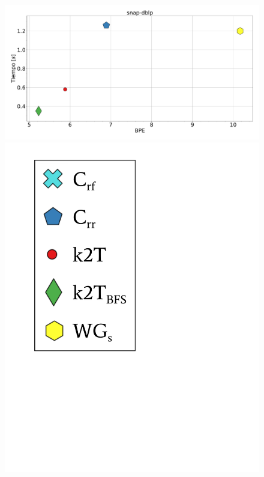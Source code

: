 \begin{figure}
    	\centering
    	\begin{minipage}{1\textwidth}
    			\centering
    			\begin{minipage}{0.8\textwidth}
    				\centering
    				\includegraphics[width=1\linewidth]{img/bpeTimes/secuencial/snap-dblp.pdf}
    			\end{minipage}
    			\begin{minipage}{0.15\textwidth}
    				\centering
    				\includegraphics[scale=.24, clip, trim=70 290 290 30]{img/bpeTimes/labelSec.pdf}
    			\end{minipage}
    			

\end{minipage}
\end{figure}
